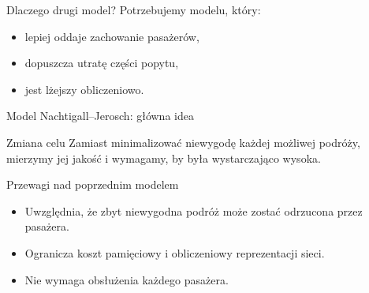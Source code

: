 \documentclass[ignorenonframetext]{beamer}
\begin{document}
\begin{frame}{Dlaczego drugi model?}
  Potrzebujemy modelu, który:
  \begin{itemize}
  \item lepiej oddaje zachowanie pasażerów,
  \item dopuszcza utratę części popytu,
  \item jest lżejszy obliczeniowo.
  \end{itemize}
\end{frame}

\begin{frame}{Model Nachtigall--Jerosch: główna idea}
  \begin{exampleblock}{Zmiana celu}
    Zamiast minimalizować niewygodę każdej możliwej podróży, mierzymy jej
    jakość i wymagamy, by była wystarczająco wysoka.
  \end{exampleblock}
  \begin{block}{Przewagi nad poprzednim modelem}
    \begin{itemize}
    \item Uwzględnia, że zbyt niewygodna podróż może zostać odrzucona przez pasażera.
    \item Ogranicza koszt pamięciowy i obliczeniowy reprezentacji sieci.
    \item Nie wymaga obsłużenia każdego pasażera.
    \end{itemize}
  \end{block}
\end{frame}
\end{document}
